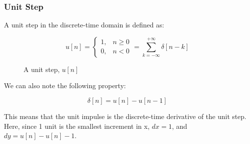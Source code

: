 \documentclass[letterpaper,12pt]{article}
\begin{document}
\subsubsection*{Unit Step}
A unit step in the discrete-time domain is defined as:

\[u[n] =
    \begin{cases}
        1, & n \geq 0 \\
        0, & n < 0
    \end{cases}
    = \sum_{k=-\infty}^{+\infty} \delta[n-k]\]

\begin{figure}[!ht]
    \centering
    
    \caption{A unit step, $u[n]$}\label{fig:unit_step}
\end{figure}

We can also note the following property:

\[\delta [n] = u[n] - u[n-1]\]

This means that the unit impulse is the discrete-time derivative of the unit step. Here, since 1 unit is the smallest increment in x, $dx = 1$, and $dy = u[n] - u[n] - 1$.
\end{document}
